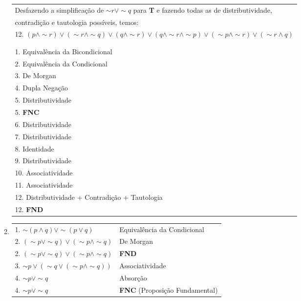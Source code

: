 \documentclass[12pt, a4paper,final]{article}
\begin{document}
\begin{enumerate}
\begin{enumerate}[label=(\alph*), leftmargin = 5mm]
\begin{tabular}{l}
                    Desfazendo a simplificação de $\sim r \vee \sim q$ para \textbf{T} e fazendo todas as de distributividade,\\ contradição e tautologia possíveis, temos:\\
                    12. $(p \wedge \sim r) \vee (\sim r \wedge \sim q) \vee (q \wedge \sim r) \vee (q \wedge \sim r \wedge \sim p) \vee (\sim p \wedge \sim r) \vee (\sim r \wedge q)$ \\
                    \\
                    \\
                    1. Equivalência da Bicondicional \\
                    2. Equivalência da Condicional \\
                    3. De Morgan \\
                    4. Dupla Negação \\
                    5. Distributividade \\
                    5. \textbf{FNC} \\
                    6. Distributividade \\
                    7. Distributividade \\
                    8. Identidade \\
                    9. Distributividade \\
                    10. Associatividade \\ 
                    11. Associatividade \\
                    12. Distributividade + Contradição + Tautologia \\
                    12. \textbf{FND}
                \end{tabular}
            
            \item   
            
                \begin{tabular}{ll}
                    1. $\sim (p \wedge q) \vee \sim (p \vee q)$ & Equivalência da Condicional \\
                    2. $(\sim p \vee \sim q) \vee (\sim p \wedge \sim q)$ & De Morgan \\
                    2. $(\sim p \vee \sim q) \vee (\sim p \wedge \sim q)$ & \textbf{FND} \\
                    3. $\sim p \vee (\sim q \vee (\sim p \wedge \sim q))$ & Associatividade \\
                    4. $\sim p \vee \sim q$ & Absorção \\
                    4. $\sim p \vee \sim q$ & \textbf{FNC} (Proposição Fundamental) \\
                \end{tabular}
            

\end{enumerate}
\end{enumerate}
\end{document}
